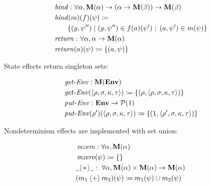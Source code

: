 \small\begin{align*}
&\hspace{0em}  \operatorname{\mathit{bind}}   \mathbin{\colon}   \forall   \alpha ,  \mathtt{\mathbf{M}}(  \alpha )  \rightarrow  ( \alpha   \rightarrow   \mathtt{\mathbf{M}}(  \beta ))  \rightarrow   \mathtt{\mathbf{M}}(  \beta ) \\
&\hspace{0em}  \operatorname{\mathit{bind}}( m)(f)( \psi )  \coloneqq   \\
&\hspace{2em}  \{ (y, \psi '')  \;|\;  (y, \psi '')  \in  f(a)( \psi ')  \;;\;  (a, \psi ')  \in  m( \psi ) \}  \\
&\hspace{0em}  \operatorname{\mathit{return}}   \mathbin{\colon}   \forall   \alpha ,  \alpha   \rightarrow   \mathtt{\mathbf{M}}(  \alpha ) \\
&\hspace{0em}  \operatorname{\mathit{return}}( a)( \psi )  \coloneqq   \{ (a, \psi ) \} 
\end{align*}\normalsize

State effects return singleton sets:

\small\begin{align*}
&\hspace{0em}  \operatorname{\mathit{get-Env}}   \mathbin{\colon}   \mathtt{\mathbf{M}}(  \mathtt{\mathbf{Env}})  \\
&\hspace{0em}  \operatorname{\mathit{get-Env}}(  \langle  \rho , \sigma , \kappa , \tau  \rangle )  \coloneqq   \{ ( \rho , \langle  \rho , \sigma , \kappa , \tau  \rangle ) \}  \\
&\hspace{0em}  \operatorname{\mathit{put-Env}}   \mathbin{\colon}   \mathtt{\mathbf{Env}}   \rightarrow   \mathcal{P} (1) \\
&\hspace{0em}  \operatorname{\mathit{put-Env}}(  \rho ')( \langle  \rho , \sigma , \kappa , \tau  \rangle )  \coloneqq   \{ (1, \langle  \rho ', \sigma , \kappa , \tau  \rangle ) \} 
\end{align*}\normalsize

Nondeterminism effects are implemented with set union:

\small\begin{align*}
&\hspace{0em}  \operatorname{\mathit{mzero}}   \mathbin{\colon}   \forall   \alpha ,  \mathtt{\mathbf{M}}(  \alpha ) \\
&\hspace{0em}  \operatorname{\mathit{mzero}}(  \psi )  \coloneqq   \{  \}  \\
&\hspace{0em}  \underline{\hspace{0.5em}}{  \mathbin{\langle + \rangle}  }\underline{\hspace{0.5em}}   \mathbin{\colon}   \forall   \alpha ,  \mathtt{\mathbf{M}}(  \alpha )  \times   \mathtt{\mathbf{M}}(  \alpha )  \rightarrow   \mathtt{\mathbf{M}}(  \alpha ) \\
&\hspace{0em} (m _1   \mathbin{\langle + \rangle}  m _2 )( \psi )  \coloneqq  m _1 ( \psi )  \cup  m _2 ( \psi )
\end{align*}\normalsize


